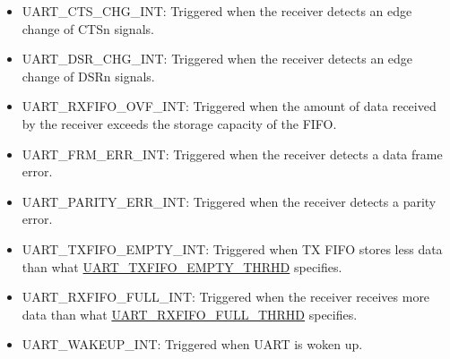 \documentclass[main\_\_EN.tex]{subfiles}
\begin{document}
\begin{itemize}
\item \label{int:UARTCTSCHGINT}UART\_CTS\_CHG\_INT: Triggered when the receiver detects an edge change of CTSn signals.
\item \label{int:UARTDSRCHGINT}UART\_DSR\_CHG\_INT: Triggered when the receiver detects an edge change of DSRn signals.
\item \label{int:UARTRXFIFOOVFINT}UART\_RXFIFO\_OVF\_INT: Triggered when the amount of data received by the receiver exceeds the storage capacity of the FIFO.
\item \label{int:UARTFRMERRINT}UART\_FRM\_ERR\_INT: Triggered when the receiver detects a data frame error. 
\item \label{int:UARTPARITYERRINT}UART\_PARITY\_ERR\_INT: Triggered when the receiver detects a parity error.
\item \label{int:UARTTXFIFOEMPTYINT}UART\_TXFIFO\_EMPTY\_INT: Triggered when TX FIFO stores less data than what \hyperref[fielddesc:UARTTXFIFOEMPTYTHRHD]{UART\_TXFIFO\_EMPTY\_THRHD} specifies.
\item \label{int:UARTRXFIFOFULLINT}UART\_RXFIFO\_FULL\_INT: Triggered when the receiver receives more data than what \hyperref[fielddesc:UARTRXFIFOFULLTHRHD]{UART\_RXFIFO\_FULL\_THRHD} specifies.
\item \label{int:UARTWAKEUPINT}UART\_WAKEUP\_INT: Triggered when UART is woken up.
\end{itemize}
\end{document}
